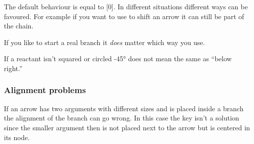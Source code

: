 \documentclass[toc=index,DIV10]{cnpkgdoc}
\begin{document}
The default behaviour is equal to [0]{}. In different situations
different ways can be favoured. For example if you want to use  to
shift an arrow it can still be part of the chain.
\begin{beispiel}
 \begin{rxn}
  \branch[,,yshift=1em]{\arrow{}{}}
 \end{rxn}
\end{beispiel}

If you like to start a real branch it \emph{does} matter which way you use.
\begin{beispiel}
 \makevisible
 \begin{rxn}
  \arrow{}{}
  \branch[a.-45]{\arrow[-45]{}{}}
 \end{rxn}
 \begin{rxn}
  \arrow{}{}
  \branch[below right=of a]{\arrow[-45]{}{}}
 \end{rxn}
\end{beispiel}

If a reactant isn't squared or circled \ang{-45} does not mean the same as
``below right.''
\begin{beispiel}
 \makevisible
 \begin{rxn}
  \arrow{}{}
  \branch[a.-45]{\arrow[-45]{}{}}
 \end{rxn}
 \begin{rxn}
  \arrow{}{}
  \branch[below right=of a]{\arrow[-45]{}{}}
 \end{rxn}
\end{beispiel}

\subsubsection{Alignment problems}\label{sssec:branch_ausrichtung}
If an arrow has two arguments with different sizes and is placed inside a branch
the alignment of the branch can go wrong. In this case the  key
 isn't a solution since the smaller argument then is not placed next
to the arrow but is centered in its node.
\begin{beispiel}
 \makevisible
 \begin{rxn}
  \arrow{}{}
 \end{rxn}
\end{beispiel}
\end{document}
